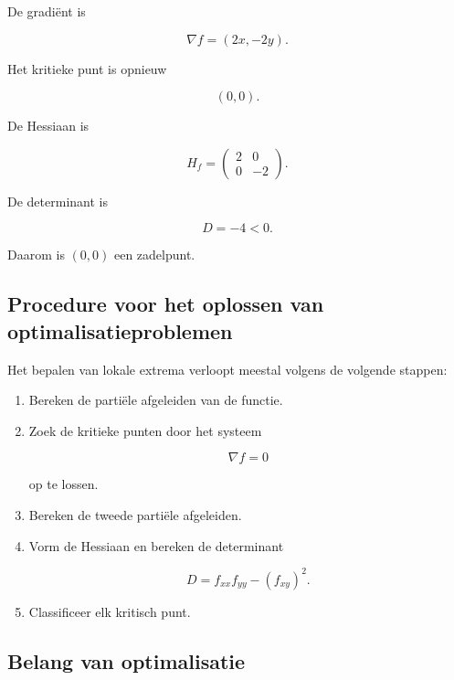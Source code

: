 \documentclass[11pt,a4paper]{article}
\begin{document}
    De gradiënt is

    \[
        \nabla f = (2x,-2y).
    \]

    Het kritieke punt is opnieuw

    \[
        (0,0).
    \]

    De Hessiaan is

    \[
        H_f =
        \begin{pmatrix}
            2 & 0 \\
            0 & -2
        \end{pmatrix}.
    \]

    De determinant is

    \[
        D = -4 < 0.
    \]

    Daarom is $(0,0)$ een zadelpunt.

    \subsection{Procedure voor het oplossen van optimalisatieproblemen}

    Het bepalen van lokale extrema verloopt meestal volgens
    de volgende stappen:

    \begin{enumerate}

        \item Bereken de partiële afgeleiden van de functie.

        \item Zoek de kritieke punten door het systeem

        \[
            \nabla f = 0
        \]

        op te lossen.

        \item Bereken de tweede partiële afgeleiden.

        \item Vorm de Hessiaan en bereken de determinant

        \[
            D = f_{xx}f_{yy} - (f_{xy})^2.
        \]

        \item Classificeer elk kritisch punt.

    \end{enumerate}

    \subsection{Belang van optimalisatie}
\end{document}
